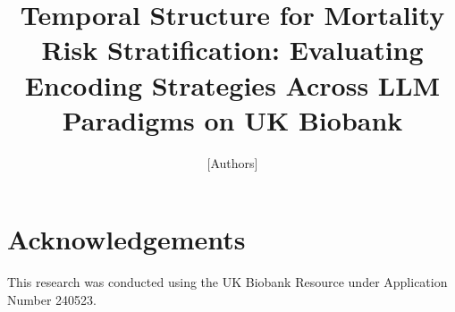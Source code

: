 \documentclass[runningheads]{llncs}
\begin{document}
\title{Temporal Structure for Mortality Risk Stratification: Evaluating
       Encoding Strategies Across LLM Paradigms on UK Biobank}
\authorrunning{[Authors]}

\author{[Authors]}
\institute{[Institution]}
\maketitle









\section*{Acknowledgements}
This research was conducted using the UK Biobank Resource under
Application Number 240523.





\end{document}
